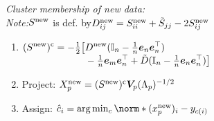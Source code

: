 \emph{Cluster membership of new data:}\\
\textit{Note:}\enspace $S^\mathrm{new}$ is def. by\enspace $D_{ij}^\mathrm{new} = S_{ii}^\mathrm{new} + \tilde S_{jj} - 2 S_{ij}^\mathrm{new}$
\begin{enumerate}
    \item $\begin{aligned}[t]
        (S^\mathrm{new})^\mathrm{c} = -\tfrac12 \big[ &
            D^\mathrm{new} (\mathbb I_n - \tfrac1n \bm e_n \bm e_n^\top)
        \\[-3pt] &
            - \tfrac1n \bm e_m \bm e_n^\top + \tilde D (\mathbb I_n - \tfrac1n \bm e_n \bm e_n^\top) \big]
    \end{aligned}$
    \item Project:
        \enspace $X_p^\mathrm{new} = (S^\mathrm{new})^\mathrm{c} \bm V_p (\Lambda_p)^{-1/2}$
    \item Assign:
        \enskip $\hat c_i = \arg\min_c \norm*{(x_p\ap{new})_i - y_{c(i)}}$
\end{enumerate}

\iffalse
    \subsection{Alternative Costs}
    \todo{}
\fi

